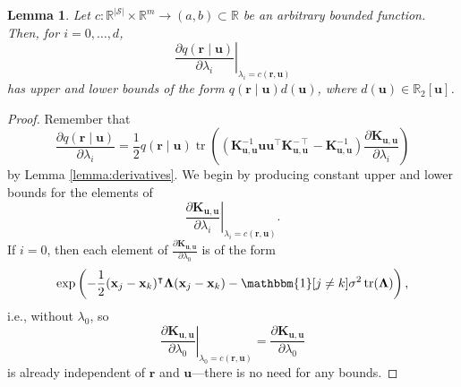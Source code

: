 \documentclass{article}
\newtheorem{lemma}[theorem]{Lemma}
\theoremstyle{definition}
\theoremstyle{remark}
\DeclareMathOperator{\tr}{tr}
\newcommand{\Kuu}{\mathbf{K}_{\mathbf{u},\mathbf{u}}}
\begin{document}
\begin{lemma} \label{lemma:bound1} %
  Let $c : \mathbb{R}^{|\mathcal{S}|} \times \mathbb{R}^m \to (a, b) \subset
  \mathbb{R}$ be an arbitrary bounded function. Then, for $i = 0,
  \dots, d$,
  \[
    \left. \frac{\partial q(\mathbf{r} \mid \mathbf{u})}{\partial \lambda_i} \right|_{\lambda_i
      = c(\mathbf{r}, \mathbf{u})}
  \]
  has upper and lower bounds of the form $q(\mathbf{r} \mid \mathbf{u})d(\mathbf{u})$, where
  $d(\mathbf{u}) \in \mathbb{R}_2[\mathbf{u}]$.
\end{lemma}
\begin{proof}
  Remember that
  \[
    \frac{\partial q(\mathbf{r} \mid \mathbf{u})}{\partial \lambda_i} =
    \frac{1}{2}q(\mathbf{r} \mid \mathbf{u})\tr
    \left((\Kuu^{-1}\mathbf{u}\mathbf{u}^\intercal\Kuu^{-\intercal} - \Kuu^{-1})
      \frac{\partial \Kuu}{\partial \lambda_i}
    \right)
  \]
  by Lemma \ref{lemma:derivatives}. We begin by producing constant upper and
  lower bounds for the elements of
  \[
    \left. \frac{\partial \Kuu}{\partial \lambda_i} \right|_{\lambda_i =
      c(\mathbf{r}, \mathbf{u})}.
  \]
  If $i = 0$, then each element of $\frac{\partial
    \Kuu}{\partial \lambda_0}$ is of the form
  \[
    \exp \left( -\frac{1}{2}(\mathbf{x}_j - \mathbf{x}_k)^\intercal
      \bm\Lambda (\mathbf{x}_j - \mathbf{x}_k) - \mathbbm{1}[j \ne
      k]\sigma^2\tr(\bm\Lambda) \right),
  \]
  i.e., without $\lambda_0$, so
  \[
    \left. \frac{\partial \Kuu}{\partial \lambda_0} \right|_{\lambda_0 =
      c(\mathbf{r}, \mathbf{u})} = \frac{\partial \Kuu}{\partial \lambda_0}
  \]
  is already independent of $\mathbf{r}$ and $\mathbf{u}$---there is no need
  for any bounds.


\end{proof}
\end{document}
